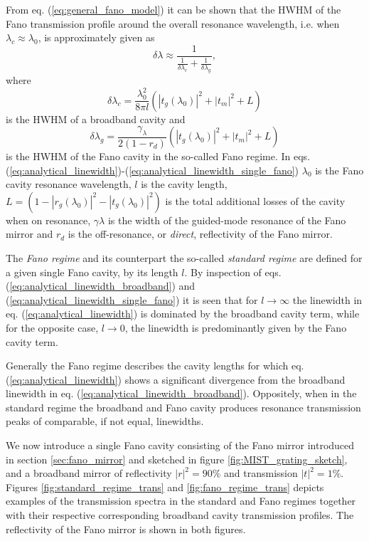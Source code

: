 From eq. (\ref{eq:general_fano_model}) it can be shown that the HWHM of the Fano transmission profile around the overall resonance wavelength, i.e. when $\lambda_c \approx \lambda_0$, is approximately given as
\begin{equation}
    \delta \lambda \approx \frac{1}{\frac{1}{\delta \lambda_c} + \frac{1}{\delta \lambda_g}},
    \label{eq:analytical_linewidth}
\end{equation}
where 
\begin{equation}
    \delta \lambda_c = \frac{\lambda_0^2}{8 \pi l} (|t_g(\lambda_0)|^2 + |t_m|^2 + L)
    \label{eq:analytical_linewidth_broadband}
\end{equation}
is the HWHM of a broadband cavity and
\begin{equation}
    \delta \lambda_g = \frac{\gamma_{\lambda}}{2 (1-r_d)}(|t_g(\lambda_0)|^2 + |t_m|^2 + L)
    \label{eq:analytical_linewidth_single_fano}
\end{equation}
is the HWHM of the Fano cavity in the so-called Fano regime.\cite{Mitra}\cite{Darki} In eqs. (\ref{eq:analytical_linewidth})-(\ref{eq:analytical_linewidth_single_fano}) $\lambda_0$ is the Fano cavity resonance wavelength, $l$ is the cavity length, $L = \left(1 - |r_g(\lambda_0)|^2 - |t_g(\lambda_0)|^2\right)$ is the total additional losses of the cavity when on resonance, $\gamma \lambda$ is the width of the guided-mode resonance of the Fano mirror and $r_d$ is the off-resonance, or \emph{direct}, reflectivity of the Fano mirror.

The \emph{Fano regime} and its counterpart the so-called \emph{standard regime} are defined for a given single Fano cavity, by its length $l$. By inspection of eqs. (\ref{eq:analytical_linewidth_broadband}) and (\ref{eq:analytical_linewidth_single_fano}) it is seen that for $l \rightarrow \infty$ the linewidth in eq. (\ref{eq:analytical_linewidth}) is dominated by the broadband cavity term, while for the opposite case, $l \rightarrow 0$, the linewidth is predominantly given by the Fano cavity term. 

Generally the Fano regime describes the cavity lengths for which eq. (\ref{eq:analytical_linewidth}) shows a significant divergence from the broadband linewidth in eq. (\ref{eq:analytical_linewidth_broadband}). Oppositely, when in the standard regime the broadband and Fano cavity produces resonance transmission peaks of comparable, if not equal, linewidths.

We now introduce a single Fano cavity consisting of the Fano mirror introduced in section \ref{sec:fano_mirror} and sketched in figure \ref{fig:MIST_grating_sketch}, and a broadband mirror of reflectivity $|r|^2=90\%$ and transmission $|t|^2=1\%$. Figures \ref{fig:standard_regime_trans} and \ref{fig:fano_regime_trans} depicts examples of the transmission spectra in the standard and Fano regimes together with their respective corresponding broadband cavity transmission profiles. The reflectivity of the Fano mirror is shown in both figures.

